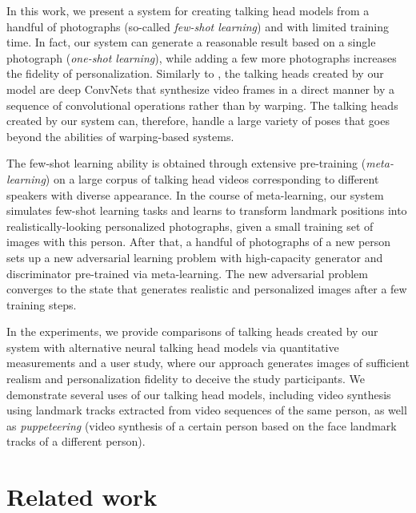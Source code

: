 \documentclass[10pt,twocolumn,letterpaper]{article}
\begin{document}
In this work, we present a system for creating talking head models from a handful of photographs (so-called \textit{few-shot learning}) and with limited training time. In fact, our system can generate a reasonable result based on a single photograph (\textit{one-shot learning}), while adding a few more photographs increases the fidelity of personalization. Similarly to \cite{Isola17,Kim18,Wang18c}, the talking heads created by our model are deep ConvNets that synthesize video frames in a direct manner by a sequence of convolutional operations rather than by warping. The talking heads created by our system can, therefore, handle a large variety of poses that goes beyond the abilities of warping-based systems.

The few-shot learning ability is obtained through extensive pre-training (\textit{meta-learning}) on a large corpus of talking head videos corresponding to different speakers with diverse appearance. In the course of meta-learning, our system simulates few-shot learning tasks and learns to transform landmark positions into realistically-looking personalized photographs, given a small training set of images with this person. After that, a handful of photographs of a new person sets up a new adversarial learning problem with high-capacity generator and discriminator pre-trained via meta-learning. The new adversarial problem converges to the state that generates realistic and personalized images after a few training steps.

In the experiments, we provide comparisons of talking heads created by our system with alternative neural talking head models \cite{Isola17,Wiles18} via quantitative measurements and a user study, where our approach generates images of sufficient realism and personalization fidelity to deceive the study participants. We demonstrate several uses of our talking head models, including video synthesis using landmark tracks extracted from video sequences of the same person, as well as \textit{puppeteering} (video synthesis of a certain person based on the face landmark tracks of a different person). \section{Related work}
\end{document}
